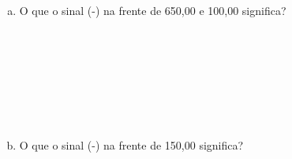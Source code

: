 \documentclass[a4paper,14pt]{article}
\begin{document}
\begin{multicols}{2}
\begin{enumerate}
			\begin{enumerate}[a)]
				\item O que o sinal (-) na frente de 650,00 e 100,00 significa? \\\\\\\\\\\\\\\\
				\item O que o sinal (-) na frente de 150,00 significa?
			\end{enumerate}
		\end{enumerate}
		$~$ \\ $~$ \\ $~$ \\ $~$ \\ $~$ \\ $~$ \\ $~$ \\ $~$ \\ $~$ \\ $~$ \\ $~$ \\ $~$ \\ $~$ \\ $~$ \\ $~$ \\ $~$ \\ $~$ \\ $~$ \\ $~$
	\end{multicols}
\end{document}

